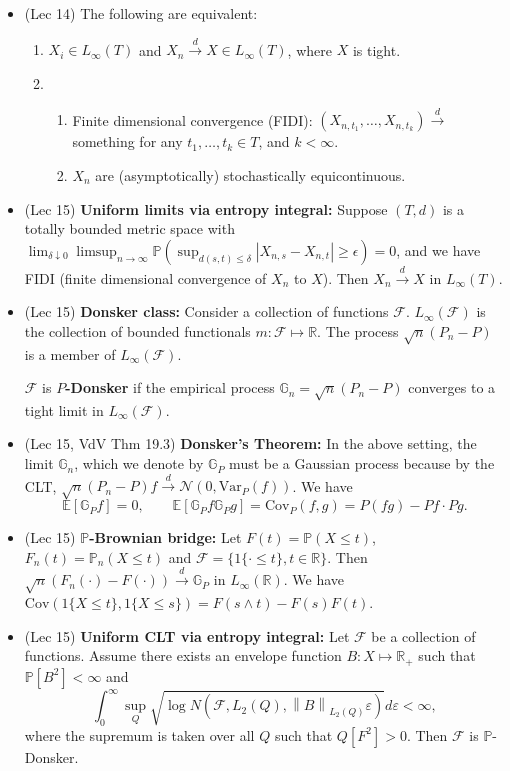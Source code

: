 \documentclass[twoside]{article}
\newcommand{\dis}{\displaystyle}
\newcommand{\norm}[1]{\left\|{#1}\right\|} %
\newcommand\bbE{\mathbb{E}}
\newcommand\bbG{\mathbb{G}}
\newcommand\bbP{\mathbb{P}}
\newcommand\bbR{\mathbb{R}}
\newcommand\calF{\mathcal{F}}
\newcommand\calN{\mathcal{N}}
\newcommand\dlt{\delta}
\def\eps{\varepsilon}
\newcommand\cd{\stackrel{d}{\goesto}}
\newcommand\goesto{\rightarrow}
\begin{document}
\begin{itemize}
\item (Lec 14) The following are equivalent:
\begin{enumerate}[label=(\roman*)]
\item $X_i \in L_\infty(T)$ and $X_n \cd X \in L_\infty(T)$, where $X$ is tight.
\item
\begin{enumerate}
\item Finite dimensional convergence (FIDI): $(X_{n, t_1}, \dots, X_{n, t_k}) \cd $ something for any $t_1, \dots, t_k \in T$, and $k < \infty$.
\item $X_n$ are (asymptotically) stochastically equicontinuous.
\end{enumerate}
\end{enumerate}

\item (Lec 15) \textbf{Uniform limits via entropy integral:} Suppose $(T,d)$ is a totally bounded metric space with $\dis\lim_{\dlt \downarrow 0} \limsup_{n \to \infty} \bbP \left( \sup_{d(s,t) \leq \dlt} |X_{n,s}-X_{n,t}| \geq \epsilon \right) = 0$, and we have FIDI (finite dimensional convergence of $X_n$ to $X$). Then $X_n \cd X$ in $L_\infty(T)$.

\item (Lec 15) \textbf{Donsker class:} Consider a collection of functions $\calF$. $L_\infty(\calF)$ is the collection of bounded functionals $m: \calF \mapsto \bbR$. The process $\sqrt{n}(P_n - P)$ is a member of $L_\infty(\calF)$.

$\calF$ is \textbf{$P$-Donsker} if the empirical process $\bbG_n = \sqrt{n}(P_n-P)$ converges to a tight limit in $L_{\infty}(\calF)$.

\item (Lec 15, VdV Thm 19.3) \textbf{Donsker's Theorem:} In the above setting, the limit $\bbG_n$, which we denote by $\bbG_P$ must be a Gaussian process because by the CLT, $\sqrt{n}(P_n - P)f \cd \calN(0, \text{Var}_P (f))$. We have
\[ \bbE [\bbG_P f] = 0, \qquad \bbE [\bbG_P f \bbG_P g] = \text{Cov}_P(f, g) = P(fg) - Pf \cdot Pg. \]

\item (Lec 15) \textbf{$\bbP$-Brownian bridge:} Let $F(t) = \bbP(X \leq t)$, $F_n(t) = \bbP_n(X \leq t)$ and $\calF = \{1\{\cdot \leq t\}, t \in \bbR \}$. Then $\sqrt{n}(F_n(\cdot) - F(\cdot)) \cd \bbG_P$ in $L_\infty(\bbR)$. We have $\text{Cov}(1\{X \leq t\}, 1\{X \leq s\}) = F(s \wedge t) - F(s)F(t)$.

\item (Lec 15) \textbf{Uniform CLT via entropy integral:} Let $\calF$ be a collection of functions. Assume there exists an envelope function $B : X \mapsto \bbR_+$ such that $\bbP [B^2] < \infty$ and
\[ \int_0^\infty \sup_Q \sqrt{\log N(\calF, L_2(Q), \norm{B}_{L_2(Q)}\eps)} d\eps < \infty, \]
where the supremum is taken over all $Q$ such that $Q [F^2] > 0$. Then $\calF$ is $\bbP$-Donsker.


\end{itemize}
\end{document}
